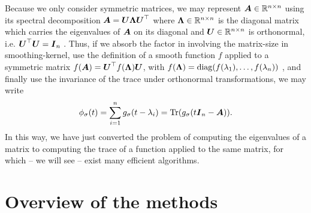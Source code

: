 Because we only consider symmetric matrices, 
we may represent $\boldsymbol{A} \in \mathbb{R}^{n \times n}$ using its spectral
decomposition $\boldsymbol{A} = \boldsymbol{U} \boldsymbol{\Lambda} \boldsymbol{U}^{\top}$ where
$\boldsymbol{\Lambda} \in \mathbb{R}^{n \times n}$ is the diagonal matrix which carries
the eigenvalues of $\boldsymbol{A}$ on its diagonal and $\boldsymbol{U} \in \mathbb{R}^{n \times n}$
is orthonormal, i.e. $\boldsymbol{U}^{\top} \boldsymbol{U} = \boldsymbol{I}_n$ \cite[theorem~4.1.5]{horn1985matrix}.
Thus, if we absorb the factor in 
involving the \gls{matrix-size} in \gls{smoothing-kernel},
use the definition of a smooth function $f$ applied to a symmetric matrix
$f(\boldsymbol{A}) = \boldsymbol{U}^{\top} f(\boldsymbol{\Lambda}) \boldsymbol{U}$,
with $f(\boldsymbol{\Lambda}) = \operatorname{diag}(f(\lambda_1), \dots, f(\lambda_n))$ \cite[definition~1.2]{higham2008functions},
and finally use the invariance of the trace under orthonormal transformations, we may write
\begin{equation}
    \phi_{\sigma}(t) = \sum_{i=1}^n g_{\sigma}(t - \lambda_i) = \operatorname{Tr}(g_{\sigma}(t\boldsymbol{I}_n - \boldsymbol{A})).
    \label{equ:1-introduction-spectral-density-as-trace}
\end{equation}
In this way, we have just converted the problem of computing the eigenvalues of
a matrix to computing the trace of a function applied to the same matrix,
for which -- we will see -- exist many efficient algorithms.


\section{Overview of the methods}
\label{sec:1-introduction-overview}

